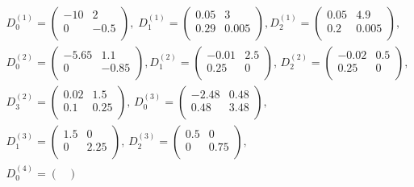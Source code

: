\documentclass[11pt]{article}
\begin{document}
\begin{gather*}
D_0^{(1)}=\begin{pmatrix}
  -10 & 2 \\
  0 & -0.5 \\
\end{pmatrix},\;
D_1^{(1)}=\begin{pmatrix}
  0.05 & 3 \\
  0.29 & 0.005 \\
\end{pmatrix},
D_2^{(1)}=\begin{pmatrix}
  0.05 & 4.9 \\
  0.2 & 0.005 \\
\end{pmatrix},\,\\
D_0^{(2)}=\begin{pmatrix}
  -5.65 & 1.1 \\
  0 & -0.85 \\
\end{pmatrix},
D_1^{(2)}=\begin{pmatrix}
  -0.01 & 2.5 \\
  0.25 & 0 \\
\end{pmatrix},\,D_2^{(2)}=\begin{pmatrix}
  -0.02 & 0.5 \\
  0.25 & 0 \\
\end{pmatrix},\\D_3^{(2)}=\begin{pmatrix}
  0.02 & 1.5 \\
  0.1 & 0.25 \\
\end{pmatrix},\,
D_0^{(3)}=\begin{pmatrix}
  -2.48 & 0.48 \\
  0.48 & 3.48 \\
\end{pmatrix},\\D_1^{(3)}=\begin{pmatrix}
  1.5 & 0 \\
  0 & 2.25 \\
\end{pmatrix},\,
D_2^{(3)}=\begin{pmatrix}
  0.5 & 0 \\
  0 & 0.75 \\
\end{pmatrix},\\D_0^{(4)}=\begin{pmatrix}

\end{pmatrix}
\end{gather*}
\end{document}
